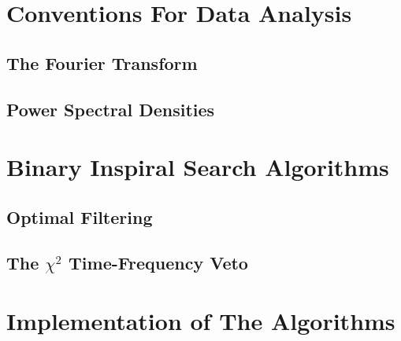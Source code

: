 \section{Conventions For Data Analysis}

\subsection{The Fourier Transform}

\subsection{Power Spectral Densities}

\section{Binary Inspiral Search Algorithms}

\subsection{Optimal Filtering}

\subsection{The $\chi^2$ Time-Frequency Veto}

\section{Implementation of The Algorithms}

